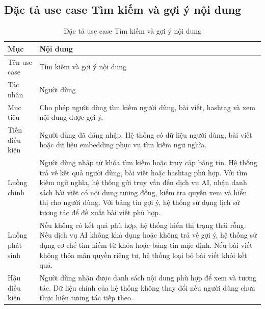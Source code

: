 \documentclass[../DoAn.tex]{subfiles}
\begin{document}
\subsection{Đặc tả use case Tìm kiếm và gợi ý nội dung}
\label{subsection:2.3.6}
\begin{table}[H]
\centering
\caption{Đặc tả use case Tìm kiếm và gợi ý nội dung}
\label{table:uc-search-recommend}
\begin{tabular}{|p{3.5cm}|p{9.5cm}|}
\hline
\textbf{Mục} & \textbf{Nội dung} \\
\hline
Tên use case & Tìm kiếm và gợi ý nội dung \\
\hline
Tác nhân & Người dùng \\
\hline
Mục tiêu & Cho phép người dùng tìm kiếm người dùng, bài viết, hashtag và xem nội dung được gợi ý. \\
\hline
Tiền điều kiện & Người dùng đã đăng nhập. Hệ thống có dữ liệu người dùng, bài viết hoặc dữ liệu embedding phục vụ tìm kiếm ngữ nghĩa. \\
\hline
Luồng chính & Người dùng nhập từ khóa tìm kiếm hoặc truy cập bảng tin. Hệ thống trả về kết quả người dùng, bài viết hoặc hashtag phù hợp. Với tìm kiếm ngữ nghĩa, hệ thống gửi truy vấn đến dịch vụ AI, nhận danh sách bài viết có nội dung tương đồng, kiểm tra quyền xem và hiển thị cho người dùng. Với bảng tin gợi ý, hệ thống sử dụng lịch sử tương tác để đề xuất bài viết phù hợp. \\
\hline
Luồng phát sinh & Nếu không có kết quả phù hợp, hệ thống hiển thị trạng thái rỗng. Nếu dịch vụ AI không khả dụng hoặc không trả về gợi ý, hệ thống sử dụng cơ chế tìm kiếm từ khóa hoặc bảng tin mặc định. Nếu bài viết không thỏa mãn quyền riêng tư, hệ thống loại bỏ bài viết khỏi kết quả. \\
\hline
Hậu điều kiện & Người dùng nhận được danh sách nội dung phù hợp để xem và tương tác. Dữ liệu chính của hệ thống không thay đổi nếu người dùng chưa thực hiện tương tác tiếp theo. \\
\hline
\end{tabular}
\end{table}
\end{document}
